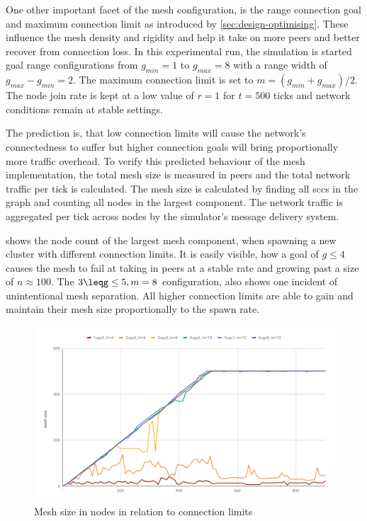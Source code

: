 One other important facet of the mesh configuration, is the range connection goal and maximum connection limit as introduced by \vref{sec:design-optimising}. These influence the mesh density and rigidity and help it take on more peers and better recover from connection loss. In this experimental run, the simulation is started goal range configurations from $g_{min}=1$ to $g_{max}=8$ with a range width of $g_{max}-g_{min}=2$. The maximum connection limit is set to $m=(g_{min}+g_{max})/2$. The node join rate is kept at a low value of $r=1$ for $t=500$ ticks and network conditions remain at stable settings.

The prediction is, that low connection limits will cause the network's connectedness to suffer but higher connection goals will bring proportionally more traffic overhead.
To verify this predicted behaviour of the mesh implementation, the total mesh size is measured in peers and the total network traffic per tick is calculated.
The mesh size is calculated by finding all \glspl{scc} in the graph and counting all nodes in the largest component. The network traffic is aggregated per tick across nodes by the simulator's message delivery system.

 shows the node count of the largest mesh component, when spawning a new cluster with different connection limits. It is easily visible, how a goal of $g\leq4$ causes the mesh to fail at taking in peers at a stable rate and growing past a size of $n\approx100$. The $3\leqg\leq5, m=8$ configuration, also shows one incident of unintentional mesh separation. All higher connection limits are able to gain and maintain their mesh size proportionally to the spawn rate.

\begin{figure}[htb!]
\centering
\includegraphics[width=1.0\textwidth]{graphics/analysis/connection-limit-largest-component.pdf}
\caption{Mesh size in nodes in relation to connection limits}
\label{fig:connection-limits-largest-component}
\end{figure}

